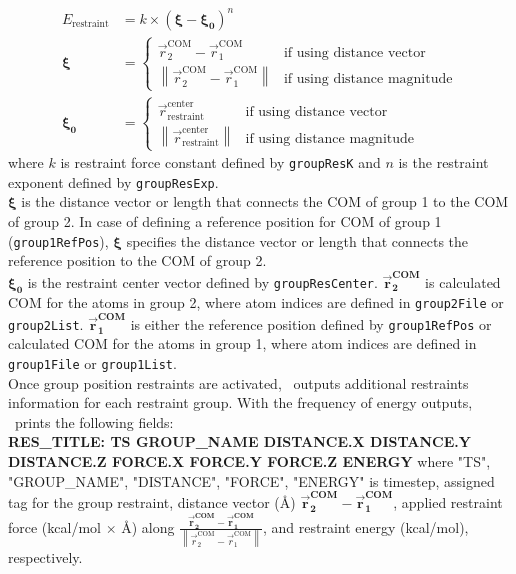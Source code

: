 \begin{align*} \label{groupResEnergy}
E_{\text{restraint}} &= k \times \left( \mathbf{\xi} - \mathbf{{\xi}_0} \right)^n \\
\mathbf{\xi} &= 
\begin{cases}
  \overrightarrow{r}^{\text{COM}}_{2} - \overrightarrow{r}^{\text{COM}}_{1} & \text{if using distance vector} \\
  \left \lVert \overrightarrow{r}^{\text{COM}}_{2} - \overrightarrow{r}^{\text{COM}}_{1} \right \rVert & \text{if using distance magnitude}
\end{cases}
\\
\mathbf{{\xi}_0} &= 
\begin{cases}
  \overrightarrow{r}^{\text{center}}_{\text{restraint}} & \text{if using distance vector} \\
  \left \lVert \overrightarrow{r}^{\text{center}}_{\text{restraint}} \right \rVert & \text{if using distance magnitude}
\end{cases}  
\end{align*}
%
where $k$ is restraint force constant defined by {\tt groupResK} and 
$n$ is the restraint exponent defined by {\tt groupResExp}. \\
$\mathbf{\xi}$ is the distance vector or length that connects the COM of
group 1 to the COM of group 2. In case of defining a reference position for 
COM of group 1 ({\tt group1RefPos}), $\mathbf{\xi}$  specifies the distance vector or length that 
connects the reference position to the COM of group 2. \\ 
$\mathbf{{\xi}_0}$ is the restraint center vector defined by {\tt groupResCenter}.
$\mathbf{\overrightarrow{r}^{\text{COM}}_{2}}$ is calculated COM for the atoms in group 2, 
where atom indices are defined in {\tt group2File} or {\tt group2List}.
$\mathbf{\overrightarrow{r}^{\text{COM}}_{1}}$ is either the reference position defined by 
{\tt group1RefPos} or calculated COM for the atoms in group 1, 
where atom indices are defined in {\tt group1File} or {\tt group1List}. \\

Once group position restraints are activated, \NAMD\ outputs additional restraints information for 
each restraint group. With the frequency of energy outputs, \NAMD\ prints the following fields:\\
{\bf RES\_TITLE: TS GROUP\_NAME DISTANCE.X DISTANCE.Y DISTANCE.Z FORCE.X FORCE.Y FORCE.Z ENERGY}
%
where "TS", "GROUP\_NAME", "DISTANCE", "FORCE", "ENERGY" is timestep, assigned tag for the group restraint, 
distance vector (\AA) $\mathbf{\overrightarrow{r}^{\text{COM}}_{2}} - \mathbf{\overrightarrow{r}^{\text{COM}}_{1}}$, 
applied restraint force (kcal/mol $\times$ \AA) along 
$\frac{\mathbf{\overrightarrow{r}^{\text{COM}}_{2}} - \mathbf{\overrightarrow{r}^{\text{COM}}_{1}}}{\left \lVert \overrightarrow{r}^{\text{COM}}_{2} - \overrightarrow{r}^{\text{COM}}_{1} \right \rVert}$, 
and restraint energy (kcal/mol), respectively.


